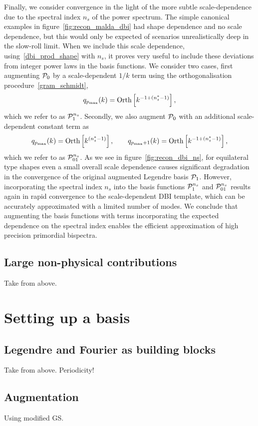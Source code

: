 Finally, we consider convergence in the light of the more subtle scale-dependence due to the spectral index $n_s$ of the power spectrum.  The simple canonical examples in figure~\ref{fig:recon_malda_dbi} had shape dependence and no scale dependence, but this would only be expected of scenarios unrealistically deep in the slow-roll limit.
When we include this scale dependence, using~\eqref{dbi_prod_shape} with $n_s$, 
it proves very useful to include these deviations from
integer power laws in the basis functions.  We consider two cases, first augmenting $\mathcal{P}_0$ by a scale-dependent $1/k$ term using the orthogonalisation procedure~\eqref{gram_schmidt}, 
\begin{align}\label{Lns_inv}
    q_{p_\text{max}}(k) = \text{Orth}\left[{k^{-1+(n_s^{*}-1)}}\right],
\end{align}
which we refer to as $\mathcal{P}^{n_s}_1$.
Secondly, we also augment $\mathcal{P}_0$ with an additional scale-dependent constant term as 
\begin{align}\label{Lns_both}
    q_{p_\text{max}}(k) = \text{Orth}\left[{k^{(n_s^{*}-1)}}\right],\qquad  q_{p_\text{max}\text{$+$}1}(k) = \text{Orth}\left[{k^{-1+(n_s^{*}-1)}}\right],
\end{align}
which we refer to as $\mathcal{P}^{n_s}_{01}$.
As we see in figure~\ref{fig:recon_dbi_ns}, for equilateral type shapes
even a small overall scale dependence causes significant degradation in the convergence of the original augmented Legendre basis $\mathcal{P}_1$.
However, incorporating the spectral index $n_s$  into the basis functions $\mathcal{P}^{n_s}_1$ and $\mathcal{P}^{n_s}_{01}$ results again in rapid convergence to the scale-dependent DBI template, which can be accurately approximated with a limited number of modes.
We conclude that augmenting the basis functions with terms incorporating the expected dependence on the spectral index enables the efficient approximation of high precision primordial bispectra. 
    \subsection{Large non-physical contributions}
    Take from above.
\section{Setting up a basis}
    \subsection{Legendre and Fourier as building blocks}
    Take from above. Periodicity!
    \subsection{Augmentation}
    Using modified GS.

